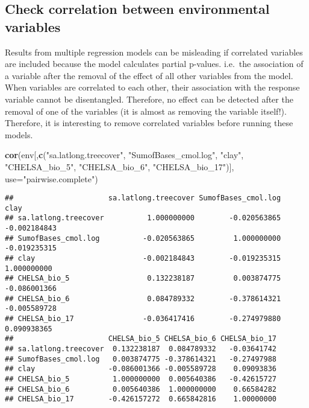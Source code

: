 \documentclass[]{article}
\newenvironment{Shaded}{\begin{snugshade}}{\end{snugshade}}
\newcommand{\DataTypeTok}[1]{\textcolor[rgb]{0.13,0.29,0.53}{#1}}
\newcommand{\KeywordTok}[1]{\textcolor[rgb]{0.13,0.29,0.53}{\textbf{#1}}}
\newcommand{\NormalTok}[1]{#1}
\newcommand{\StringTok}[1]{\textcolor[rgb]{0.31,0.60,0.02}{#1}}
\begin{document}
\hypertarget{check-correlation-between-environmental-variables}{%
\subsection{Check correlation between environmental
variables}\label{check-correlation-between-environmental-variables}}

Results from multiple regression models can be misleading if correlated
variables are included because the model calculates partial p-values.
i.e.~the association of a variable after the removal of the effect of
all other variables from the model. When variables are correlated to
each other, their association with the response variable cannot be
disentangled. Therefore, no effect can be detected after the removal of
one of the variables (it is almost as removing the variable itself!).
Therefore, it is interesting to remove correlated variables before
running these models.

\begin{Shaded}
\begin{Highlighting}[]
\KeywordTok{cor}\NormalTok{(env[,}\KeywordTok{c}\NormalTok{(}\StringTok{"sa.latlong.treecover"}\NormalTok{,}
           \StringTok{"SumofBases_cmol.log"}\NormalTok{,}
           \StringTok{"clay"}\NormalTok{,}
           \StringTok{"CHELSA_bio_5"}\NormalTok{,}
           \StringTok{"CHELSA_bio_6"}\NormalTok{,}
           \StringTok{"CHELSA_bio_17"}\NormalTok{)],}
        \DataTypeTok{use=}\StringTok{"pairwise.complete"}\NormalTok{)}
\end{Highlighting}
\end{Shaded}

\begin{verbatim}
##                      sa.latlong.treecover SumofBases_cmol.log         clay
## sa.latlong.treecover          1.000000000        -0.020563865 -0.002184843
## SumofBases_cmol.log          -0.020563865         1.000000000 -0.019235315
## clay                         -0.002184843        -0.019235315  1.000000000
## CHELSA_bio_5                  0.132238187         0.003874775 -0.086001366
## CHELSA_bio_6                  0.084789332        -0.378614321 -0.005589728
## CHELSA_bio_17                -0.036417416        -0.274979880  0.090938365
##                      CHELSA_bio_5 CHELSA_bio_6 CHELSA_bio_17
## sa.latlong.treecover  0.132238187  0.084789332   -0.03641742
## SumofBases_cmol.log   0.003874775 -0.378614321   -0.27497988
## clay                 -0.086001366 -0.005589728    0.09093836
## CHELSA_bio_5          1.000000000  0.005640386   -0.42615727
## CHELSA_bio_6          0.005640386  1.000000000    0.66584282
## CHELSA_bio_17        -0.426157272  0.665842816    1.00000000
\end{verbatim}
\end{document}
